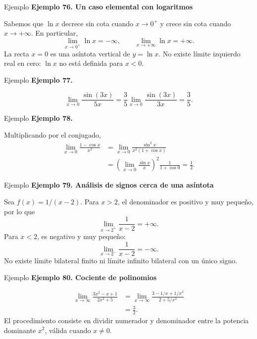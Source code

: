 \documentclass[12pt,aspectratio=169]{beamer}
\begin{document}
\begin{frame}[t,allowframebreaks]{Ejemplo}
{\color{azul}\bfseries Ejemplo 76. Un caso elemental con logaritmos}\par\medskip

Sabemos que $\ln x$ decrece sin cota cuando $x\to0^+$ y crece sin cota cuando $x\to+\infty$. En particular,
\[
\lim_{x\to0^+}\ln x=-\infty,\qquad
\lim_{x\to+\infty}\ln x=+\infty.
\]
La recta $x=0$ es una asíntota vertical de $y=\ln x$. No existe límite izquierdo real en cero: $\ln x$ no está definida para $x<0$.
\end{frame}


\begin{frame}[t,allowframebreaks]{Ejemplo}
{\color{azul}\bfseries Ejemplo 77.}\par\medskip

\[
\lim_{x\to0}\frac{\sin(3x)}{5x}
=\frac35\lim_{x\to0}\frac{\sin(3x)}{3x}=\boxed{\frac35}.
\]
\end{frame}


\begin{frame}[t,allowframebreaks]{Ejemplo}
{\color{azul}\bfseries Ejemplo 78.}\par\medskip

Multiplicando por el conjugado,
\begin{align*}
\lim_{x\to0}\frac{1-\cos x}{x^2}
&=\lim_{x\to0}\frac{\sin^2x}{x^2(1+\cos x)}\\
&=\left(\lim_{x\to0}\frac{\sin x}{x}\right)^2\frac1{1+\cos0}
=\boxed{\frac12}.
\end{align*}
\end{frame}


\begin{frame}[t,allowframebreaks]{Ejemplo}
{\color{azul}\bfseries Ejemplo 79. Análisis de signos cerca de una asíntota}\par\medskip

Sea $f(x)=1/(x-2)$. Para $x>2$, el denominador es positivo y muy pequeño, por lo que
\[\lim_{x\to2^+}\frac1{x-2}=+\infty.\]
Para $x<2$, es negativo y muy pequeño:
\[\lim_{x\to2^-}\frac1{x-2}=-\infty.\]
No existe límite bilateral finito ni límite infinito bilateral con un único signo.
\end{frame}


\begin{frame}[t,allowframebreaks]{Ejemplo}
{\color{azul}\bfseries Ejemplo 80. Cociente de polinomios}\par\medskip

\begin{align*}
\lim_{x\to\infty}\frac{3x^2-x+1}{2x^2+5}
&=\lim_{x\to\infty}\frac{3-1/x+1/x^2}{2+5/x^2}\\
&=\boxed{\frac32}.
\end{align*}
El procedimiento consiste en dividir numerador y denominador entre la potencia dominante $x^2$, válida cuando $x\ne0$.
\end{frame}
\end{document}
